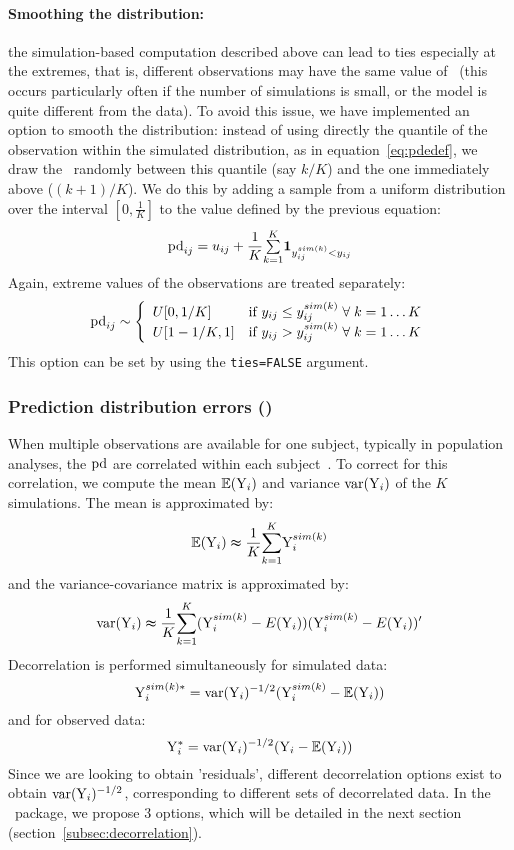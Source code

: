 \paragraph{Smoothing the distribution:} the simulation-based computation described above can lead to ties especially at the extremes, that is, different observations may have the same value of \pd~(this occurs particularly often if the number of simulations is small, or the model is quite different from the data). To avoid this issue, we have implemented an option to smooth the distribution: instead of using directly the quantile of the observation within the simulated distribution, as in equation~\ref{eq:pdedef}, we draw the \pd~randomly between this quantile (say $k/K$) and the one immediately above ($(k+1)/K$). We do this by adding a sample from a uniform distribution over the interval $\left[0,\frac{1}{K}\right]$ to the value defined by the previous equation:
\begin{equation}
{\rm pd}_{ij} = u_{ij} + \frac{1}{K}{\textstyle \overset{K}{\underset{k=1}{\sum}}\boldsymbol{1}_{y_{ij}^{sim(k)}<y_{ij}}} 
\end{equation}
Again, extreme values of the observations are treated separately:
\begin{equation*}
{\rm pd}_{ij} \sim \left\{ \begin{array}{l r}
            U[0,1/K] & \text{if } y_{ij} \leq y_{ij}^{sim(k)} \; \forall \; k=1\ldots K \\
            U[1-1/K,1] & \text{if } y_{ij} > y_{ij}^{sim(k)} \; \forall \; k=1\ldots K \\
           \end{array}
\right.
\end{equation*}
This option can be set by using the \texttt{ties=FALSE} argument.

\subsubsection{Prediction distribution errors (\pde)} 

\hskip 18pt When multiple observations are available for one subject, typically in population analyses, the ${\rm pd}$ are correlated within each subject~\cite{MentrePDE}. To correct for this correlation, we compute the mean $\mathbb{E}({\rm Y}_i)$ and variance $\hbox{var}({\rm Y}_i)$ of the $K$ simulations. The mean is approximated by: 
$$\mathbb{E}({\rm Y}_{i})\thickapprox\frac{1}{K}\overset{K}{\underset{k=1}{\sum}}{\rm Y}_{i}^{sim(k)}$$
and the variance-covariance matrix is approximated by:
$$\hbox{var}({\rm Y}_{i})\thickapprox \frac{1}{K}\overset{K}{\underset{k=1}{\sum}}({\rm Y}_{i}^{sim(k)}-E({\rm Y}_{i}))({\rm Y}_{i}^{sim(k)}-E({\rm Y}_{i}))'$$
Decorrelation is performed simultaneously for simulated data:
$$ {\rm Y}_{i}^{sim(k)*}= \hbox{var}({\rm Y}_i)^{-1/2} ({\rm Y}_{i}^{sim(k)}-\mathbb{E}({\rm Y}_i))$$
and for observed data:
$$ {\rm Y}_{i}^*= \hbox{var}({\rm Y}_i)^{-1/2} ({\rm Y}_{i}-\mathbb{E}({\rm Y}_i))$$
Since we are looking to obtain 'residuals', different decorrelation options exist to obtain $\hbox{var}({\rm Y}_i)^{-1/2}$, corresponding to different sets of decorrelated data. In the \npde~package, we propose 3 options, which will be detailed in the next section (section~\ref{subsec:decorrelation}).

